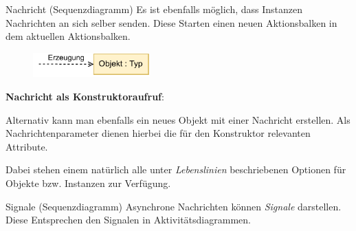 \begin{defi}{Nachricht (Sequenzdiagramm)}
    Es ist ebenfalls möglich, dass Instanzen Nachrichten an sich selber senden.
    Diese Starten einen neuen Aktionsbalken in dem aktuellen Aktionsbalken.

    \begin{figure}
        \centering
        \includegraphics[width=0.4\textwidth]{includes/figures/defi_diagrams_sequenz_message_create.pdf}
    \end{figure}
    \textbf{Nachricht als Konstruktoraufruf}:

    Alternativ kann man ebenfalls ein neues Objekt mit einer Nachricht erstellen.
    Als Nachrichtenparameter dienen hierbei die für den Konstruktor relevanten Attribute.

    Dabei stehen einem natürlich alle unter \emph{Lebenslinien} beschriebenen Optionen für Objekte bzw. Instanzen zur Verfügung.
\end{defi}

\begin{bonus}{Signale (Sequenzdiagramm)}
    Asynchrone Nachrichten können \emph{Signale} darstellen.
    Diese Entsprechen den Signalen in Aktivitätsdiagrammen.
\end{bonus}

